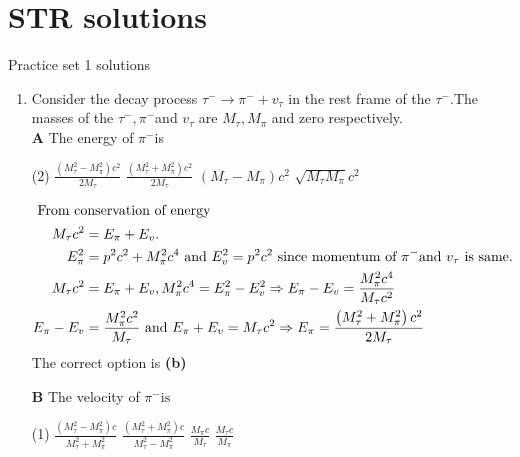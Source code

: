 \chapter{STR solutions}
\begin{abox}
	Practice set 1 solutions
	\end{abox}
\begin{enumerate}
	\item Consider the decay process $\tau^{-} \rightarrow \pi^{-}+v_{\tau}$ in the rest frame of the $\tau^{-} .$The masses of the $\tau^{-}, \pi^{-}$and $v_{\tau}$ are $M_{\tau}, M_{\pi}$ and zero respectively.\\
	\textbf{A} The energy of $\pi^{-}$is
	{}
\begin{tasks}(2)
	\task[\textbf{A.}] $\frac{\left(M_{\tau}^{2}-M_{\pi}^{2}\right) c^{2}}{2 M_{\tau}}$
	\task[\textbf{B.}]$\frac{\left(M_{\tau}^{2}+M_{\pi}^{2}\right) c^{2}}{2 M_{\tau}}$
	\task[\textbf{C.}]$\left(M_{\tau}-M_{\pi}\right) c^{2}$
	\task[\textbf{D.}]$\sqrt{M_{\tau} M_{\pi}} c^{2}$
\end{tasks}
\begin{answer}
	\begin{align*}
	\intertext { From conservation of energy }
	 M_{\tau} c^{2}&=E_{\pi}+E_{v} \text {. }\\
	E_{\pi}^{2}&=p^{2} c^{2}+M_{\pi}^{2} c^{4} \text { and } E_{v}^{2}=p^{2} c^{2} \text { since momentum of } \pi^{-} \text {and } v_{\tau} \text { is same. }\\
	M_{\tau} c^{2}&=E_{\pi}+E_{v}, M_{\pi}^{2} c^{4}=E_{\pi}^{2}-E_{v}^{2} \Rightarrow E_{\pi}-E_{v}=\frac{M_{\pi}^{2} c^{4}}{M_{\tau} c^{2}}\\
	E_{\pi}-E_{v}&=\frac{M_{\pi}^{2} c^{2}}{M_{\tau}} \text { and } E_{\pi}+E_{v}=M_{\tau} c^{2} \Rightarrow E_{\pi}=\frac{\left(M_{\tau}^{2}+M_{\pi}^{2}\right) c^{2}}{2 M_{\tau}}
	\end{align*}
	The correct option is \textbf{(b)}
\end{answer}
\textbf{B} The velocity of  $\pi^{-} \text {is }$
\begin{tasks}(1)
	\task[\textbf{A.}] $\frac{\left(M_{\tau}^{2}-M_{\pi}^{2}\right) c}{M_{\tau}^{2}+M_{\pi}^{2}}$
	\task[\textbf{B.}]$\frac{\left(M_{\tau}^{2}+M_{\pi}^{2}\right) c}{M_{\tau}^{2}-M_{\pi}^{2}}$ 
	\task[\textbf{C.}] $\frac{M_{\pi} c}{M_{\tau}}$
	\task[\textbf{D.}]$\frac{M_{\tau} c}{M_{\pi}}$
\end{tasks}
\begin{answer}
\begin{align*}

\end{align*}
\end{answer}
\end{enumerate}
